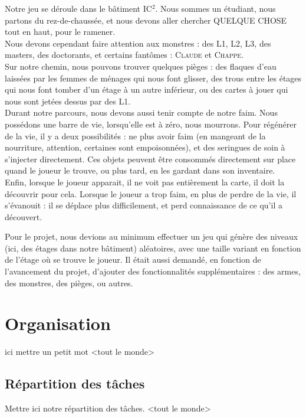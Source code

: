 \documentclass[11pt]{report}
\begin{document}
	Notre jeu se déroule dans le bâtiment IC$^2$. Nous sommes un étudiant, nous partons du rez-de-chaussée, et nous devons aller chercher QUELQUE CHOSE tout en haut, pour le ramener. \\
	Nous devons cependant faire attention aux monstres : des L1, L2, L3, des masters, des doctorants, et certains fantômes : \textsc{Claude} et \textsc{Chappe}.\\
	Sur notre chemin, nous pouvons trouver quelques pièges : des flaques d'eau laissées par les femmes de ménages qui nous font glisser, des trous entre les étages qui nous font tomber d'un étage à un autre inférieur, ou des cartes à jouer qui nous sont jetées dessus par des L1.\\
	Durant notre parcours, nous devons aussi tenir compte de notre faim. Nous possédons une barre de vie, lorsqu'elle est à zéro, nous mourrons. Pour régénérer de la vie, il y a deux possibilités : ne plus avoir faim (en mangeant de la nourriture, attention, certaines sont empoisonnées), et des seringues de soin à s'injecter directement. Ces objets peuvent être consommés directement sur place quand le joueur le trouve, ou plus tard, en les gardant dans son inventaire.\\
	Enfin, lorsque le joueur apparait, il ne voit pas entièrement la carte, il doit la découvrir pour cela. Lorsque le joueur a trop faim, en plus de perdre de la vie, il s'évanouit : il se déplace plus difficilement, et perd connaissance de ce qu'il a découvert.
	
	\vspace{12pt}
	
	Pour le projet, nous devions au minimum effectuer un jeu qui génère des niveaux (ici, des étages dans notre bâtiment) aléatoires, avec une taille variant en fonction de l'étage où se trouve le joueur. Il était aussi demandé, en fonction de l'avancement du projet, d'ajouter des fonctionnalités supplémentaires : des armes, des monstres, des pièges, ou autres.

\chapter{Organisation}

ici mettre un petit mot <tout le monde>

	\section{Répartition des tâches}
		Mettre ici notre répartition des tâches. <tout le monde>
\end{document}
